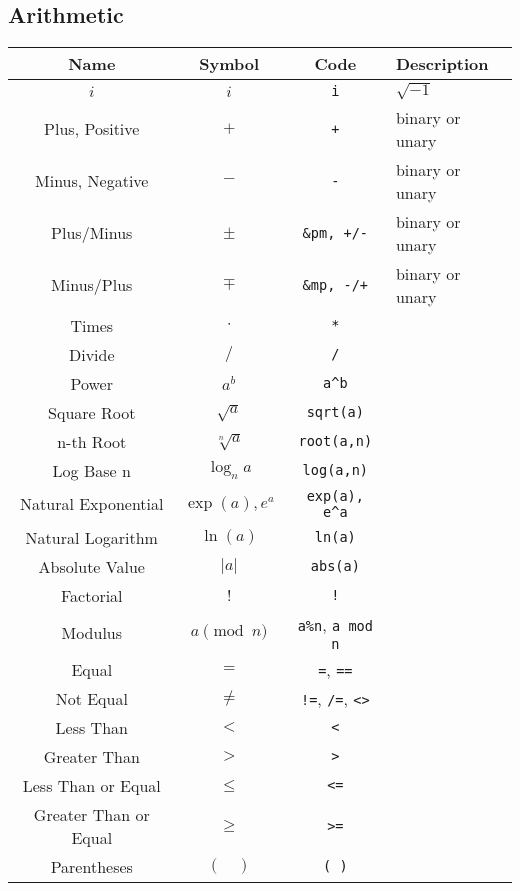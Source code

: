\documentclass{article}
\begin{document}
  \subsection{Arithmetic} %
  \label{sub:arithmetic}
  \begin{table}[!h]
    \centering
    \begin{tabular}{|c|c|c|l|}
      \hline
      \textbf{Name} & \textbf{Symbol} & \textbf{Code} & \textbf{Description} \\
      \hline\hline
      \( i \) & \( i \) & \texttt{i} & \( \sqrt{-1} \)\\
      Plus, Positive & \( + \) & \texttt{+} & binary or unary\\
      Minus, Negative & \( - \) & \texttt{-} & binary or unary\\
      Plus/Minus & \( \pm \) & \texttt{\&pm, +/-} & binary or unary\\
      Minus/Plus & \( \mp \) & \texttt{\&mp, -/+} & binary or unary\\
      Times & \( \cdot \) & \texttt{*} & \\
      Divide & \( / \) & \texttt{/} & \\
      Power & \( a^b \) & \texttt{a\^{}b} & \\
      Square Root & \( \sqrt{a} \) & \texttt{sqrt(a)} & \\
      n-th Root & \( \sqrt[n]{a} \) & \texttt{root(a,n)} & \\
      Log Base n & \( \log_n{a} \) & \texttt{log(a,n)} & \\
      Natural Exponential & \( \exp(a), e^a \) & \texttt{exp(a), e\^{}a} & \\
      Natural Logarithm & \( \ln(a) \) & \texttt{ln(a)} & \\
      Absolute Value & \( \left| a \right| \) & \texttt{abs(a)} & \\
      Factorial & \( ! \) & \texttt{!} & \\
      Modulus & \( a \pmod{n} \) & \texttt{a\%n}, \texttt{a mod n} & \\
      \hline
      Equal & \( = \) & \texttt{=}, \texttt{==} & \\
      Not Equal & \( \ne \) & \texttt{!=}, \texttt{/=}, \texttt{<>} & \\
      Less Than & \( < \) & \texttt{<} & \\
      Greater Than & \( > \) & \texttt{>} & \\
      Less Than or Equal & \( \le \) & \texttt{<=} & \\
      Greater Than or Equal & \( \ge \) & \texttt{>=} & \\
      Parentheses & \( ( \quad ) \) & \texttt{( )} & \\
      \hline
    \end{tabular}
  \end{table}
\end{document}
